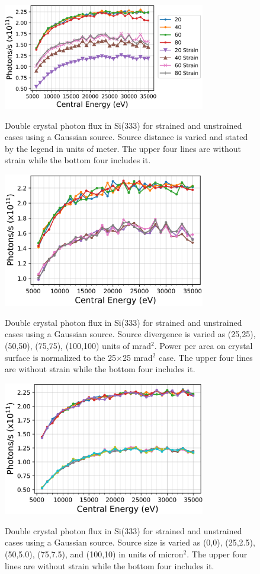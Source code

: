 \documentclass{iucr}
\begin{document}
\begin{figure}
\caption{Double crystal photon flux in Si(333) for strained and unstrained cases using a Gaussian source. Source distance is varied and stated by the legend in units of meter. The upper four lines are without strain while the bottom four includes it.}
\includegraphics[width = 8.85cm]{images/333straindistance.png}
\label{fig:333straindistance}
\end{figure}

\begin{figure}
\caption{Double crystal photon flux in Si(333) for strained and unstrained cases using a Gaussian source. Source divergence is varied as (25,25), (50,50), (75,75), (100,100) units of mrad$^2$. Power per area on crystal surface is normalized to the 25$\times$25 mrad$^2$ case. The upper four lines are without strain while the bottom four includes it.}
\includegraphics[width = 8.85cm]{images/333straindivergence.png}
\label{fig:333straindivergence}
\end{figure}

\begin{figure}
\caption{Double crystal photon flux in Si(333) for strained and unstrained cases using a Gaussian source. Source size is varied as (0,0), (25,2.5), (50,5.0), (75,7.5), and (100,10) in units of micron$^2$. The upper four lines are without strain while the bottom four includes it.}
\includegraphics[width = 8.85cm]{images/333strainsize.png}
\label{fig:333strainsourcesize}
\end{figure}
\end{document}
